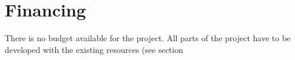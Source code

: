 \section{Financing}
There is no budget available for the project. All parts of the project have to be developed with the existing resources (see section